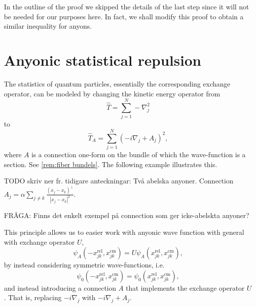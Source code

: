 In the outline of the proof we skipped the details of the last step since it will not be needed for our purposes here. In fact, we shall modify this proof to obtain a similar inequality for anyons.




\section{Anyonic statistical repulsion}

The statistics of quantum particles, essentially the corresponding exchange operator, can be modeled by changing the kinetic energy operator from
\begin{equation}
 \widehat{T} = \sum_{j=1}^N -\nabla_j^2
\end{equation}
to
\begin{equation}
 \widehat{T}_A = \sum_{j=1}^N \left( -i \nabla_j + A_j \right)^2,
\end{equation}
where $A$ is a connection one-form on the bundle of which the wave-function is a section. See \cref{rem:fiber bundels}. The following example illustrates this.

\begin{example}
  TODO skriv ner fr. tidigare anteckningar: Två abelska anyoner. Connection $A_j = \alpha \sum_{j \ne k} \frac{(x_j - x_k)^\perp}{|x_j-x_k|^2}$.
\end{example}

FRÅGA: Finns det enkelt exempel på connection som ger icke-abelskta anyoner?

This principle allows us to easier work with anyonic wave function with general with exchange operator $U$,
\begin{equation}
  \psi_A(-x_{jk}^\text{rel}, x_{jk}^\text{cm}) = U \psi_A(x_{jk}^\text{rel}, x_{jk}^\text{cm}),
\end{equation}
by instead considering symmetric wave-functions, i.e.\
\begin{equation}
  \psi_0(-x_{jk}^\text{rel}, x_{jk}^\text{cm}) = \psi_0(x_{jk}^\text{rel}, x_{jk}^\text{cm}),
\end{equation}
and instead introducing a connection $A$ that implements the exchange operator $U$. That is, replacing $-i\nabla_j$ with $-i\nabla_j+A_j$.



